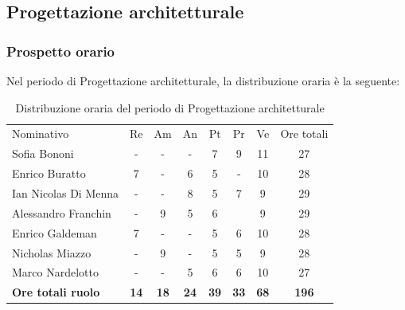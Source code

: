 \documentclass[../piano-di-progetto.tex]{subfiles}
\begin{document}
  \subsection{Progettazione architetturale}

  \subsubsection{Prospetto orario}
  Nel periodo di Progettazione architetturale, la distribuzione oraria è la seguente:
  \begin{table}[H]
    \centering
    \begin{tabular}{lccccccc}
      Nominativo                & Re          & Am          & An          & Pt          & Pr          & Ve          & Ore totali   \\
      Sofia Bononi              & -           & -           & -           & 7           & 9           & 11          & 27           \\
      Enrico Buratto            & 7           & -           & 6           & 5           & -           & 10          & 28           \\
      Ian Nicolas Di Menna      & -           & -           & 8           & 5           & 7           & 9           & 29           \\
      Alessandro Franchin       & -           & 9           & 5           & 6           &             & 9           & 29           \\
      Enrico Galdeman           & 7           & -           & -           & 5           & 6           & 10          & 28           \\
      Nicholas Miazzo           & -           & 9           & -           & 5           & 5           & 9           & 28           \\
      Marco Nardelotto          & -           & -           & 5           & 6           & 6           & 10          & 27           \\
      \textbf{Ore totali ruolo} & \textbf{14} & \textbf{18} & \textbf{24} & \textbf{39} & \textbf{33} & \textbf{68} & \textbf{196}
    \end{tabular}
    \caption{Distribuzione oraria del periodo di Progettazione architetturale}
  \end{table}
\end{document}
